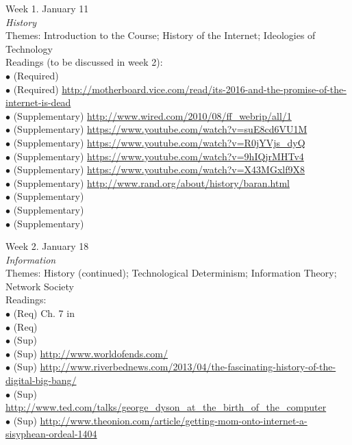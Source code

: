 \documentclass[10pt]{article}
\begin{document}
Week 1. January 11 \\
\textit{History} \\
Themes: Introduction to the Course; History of the Internet; Ideologies of Technology \\
Readings (to be discussed in week 2): \\
	$\bullet$ (Required)  \\
	$\bullet$ (Required) \url{http://motherboard.vice.com/read/its-2016-and-the-promise-of-the-internet-is-dead}\\
	$\bullet$ (Supplementary) \url{http://www.wired.com/2010/08/ff_webrip/all/1}\\
	$\bullet$ (Supplementary) \url{https://www.youtube.com/watch?v=suE8cd6VU1M}\\
	$\bullet$ (Supplementary) \url{https://www.youtube.com/watch?v=R0jYVjs_dyQ}\\
	$\bullet$ (Supplementary) \url{https://www.youtube.com/watch?v=9hIQjrMHTv4}\\
	$\bullet$ (Supplementary) \url{https://www.youtube.com/watch?v=X43MGxlf9X8}\\
	$\bullet$ (Supplementary) \url{http://www.rand.org/about/history/baran.html}\\
	$\bullet$ (Supplementary)  \\
	$\bullet$ (Supplementary)  \\
	$\bullet$ (Supplementary) 

Week 2. January 18 \\
\textit{Information} \\
Themes: History (continued); Technological Determinism; Information Theory; Network Society \\
Readings: \\
	$\bullet$ (Req) Ch. 7 in  \\
	$\bullet$ (Req) \\
	$\bullet$ (Sup) \\
	$\bullet$ (Sup) \url{http://www.worldofends.com/}\\
	$\bullet$ (Sup) \url{http://www.riverbednews.com/2013/04/the-fascinating-history-of-the-digital-big-bang/}\\
	$\bullet$ (Sup) \url{http://www.ted.com/talks/george_dyson_at_the_birth_of_the_computer} \\
	$\bullet$ (Sup) \url{http://www.theonion.com/article/getting-mom-onto-internet-a-sisyphean-ordeal-1404}
\end{document}

